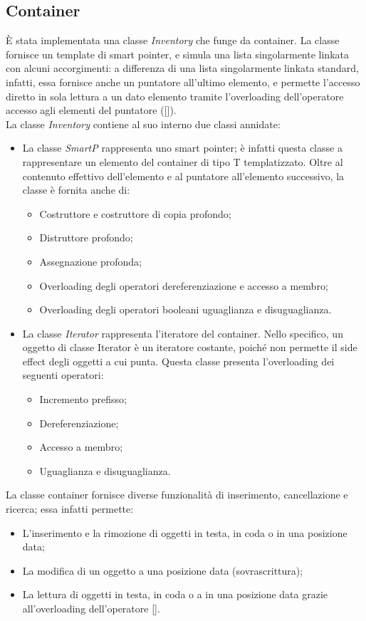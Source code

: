 \subsection{Container}
È stata implementata una classe \textit{Inventory} che funge da container. La classe fornisce un template di smart pointer, e simula una lista singolarmente linkata con alcuni accorgimenti: a differenza di una lista singolarmente linkata standard, infatti, essa fornisce anche un puntatore all'ultimo elemento, e permette l'accesso diretto in sola lettura a un dato elemento tramite l'overloading dell'operatore accesso agli elementi del puntatore ([]). \\
La classe \textit{Inventory} contiene al suo interno due classi annidate:
\begin{itemize}
  \item La classe \textit{SmartP} rappresenta uno smart pointer; è infatti questa classe a rappresentare un elemento del container di tipo T templatizzato. Oltre al contenuto effettivo dell'elemento e al puntatore all'elemento successivo, la classe è fornita anche di:
  \begin{itemize}
    \item Costruttore e costruttore di copia profondo;
    \item Distruttore profondo;
    \item Assegnazione profonda;
    \item Overloading degli operatori dereferenziazione e accesso a membro;
    \item Overloading degli operatori booleani uguaglianza e disuguaglianza.
  \end{itemize}
  \item La classe \textit{Iterator} rappresenta l'iteratore del container. Nello specifico, un oggetto di classe Iterator è un iteratore costante, poiché non permette il side effect degli oggetti a cui punta. Questa classe presenta l'overloading dei seguenti operatori:
  \begin{itemize}
    \item Incremento prefisso;
    \item Dereferenziazione;
    \item Accesso a membro;
    \item Uguaglianza e disuguaglianza.
  \end{itemize}
\end{itemize}
La classe container fornisce diverse funzionalità di inserimento, cancellazione e ricerca; essa infatti permette:
\begin{itemize}
  \item L'inserimento e la rimozione di oggetti in testa, in coda o in una posizione data;
  \item La modifica di un oggetto a una posizione data (sovrascrittura);
  \item La lettura di oggetti in testa, in coda o a in una posizione data grazie all'overloading dell'operatore [].
\end{itemize}

